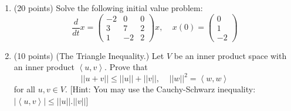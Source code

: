 \documentclass[fleqn]{article}
\begin{document}
\begin{enumerate}
    \item (20 points) Solve the following initial value problem:
    $$
      \dfrac{d}{dt}x=\begin{pmatrix}
        -2 & 0 & 0
        \\
        3 & 7 & 2
        \\
        1 & -2 & 2
      \end{pmatrix}x, ~~~~~ x(0)=\begin{pmatrix}
        0
        \\
        1
        \\
        -2
      \end{pmatrix}
    $$

            


    \item (10 points) (The Triangle Inequality.) Let $V$ be an inner product space with an inner product
    $\left\langle u, v\right\rangle$. Prove that 
    $$
      ||u+v|| \leq ||u||+||v||, ~~~~~ ||w||^2=\left\langle w, w\right\rangle
    $$
    for all $u,v \in V$.  [Hint: You may use the Cauchy-Schwarz inequality: $|\left\langle u, v\right\rangle | \leq ||u||.||v||$]

          


  \end{enumerate}
\end{document}
